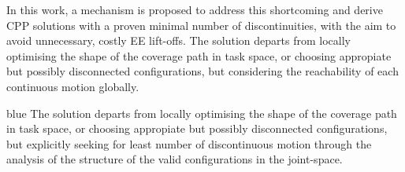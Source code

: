 \documentclass[journal]{IEEEtran}
\begin{document}
In this work, a mechanism is proposed to address this shortcoming and derive CPP solutions with a proven minimal number of discontinuities, with the aim to avoid unnecessary, costly EE lift-offs. 
The solution departs from locally optimising the shape of the coverage path in task space, or choosing appropiate but possibly disconnected configurations, 
but considering the reachability of each continuous motion globally.
\begin{color}{blue}
The solution departs from locally optimising the shape of the coverage path in task space, or choosing appropiate but possibly disconnected configurations, 
but explicitly seeking for least number of discontinuous motion through the analysis of the structure of the valid configurations in the joint-space. 
\end{color}
\end{document}

